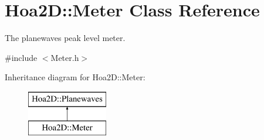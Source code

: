 \hypertarget{class_hoa2_d_1_1_meter}{\section{Hoa2\-D\-:\-:Meter Class Reference}
\label{class_hoa2_d_1_1_meter}
}


The planewaves peak level meter.  




{\ttfamily \#include $<$Meter.\-h$>$}

Inheritance diagram for Hoa2\-D\-:\-:Meter\-:\begin{figure}[H]
\begin{center}
\leavevmode
\includegraphics[height=2.000000cm]{class_hoa2_d_1_1_meter}
\end{center}
\end{figure}
